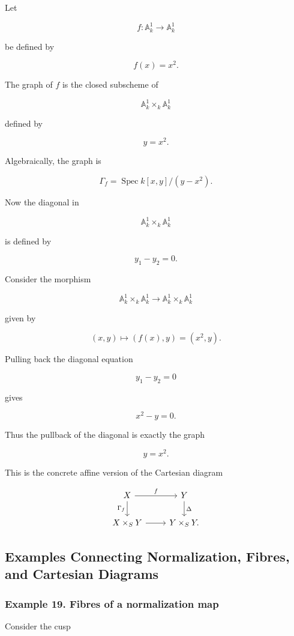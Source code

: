 \documentclass[12pt,a4paper]{article}
\theoremstyle{notespace}
\begin{document}
Let

\[
f:\mathbb{A}^1_k\to \mathbb{A}^1_k
\]

be defined by

\[
f(x)=x^2.
\]

The graph of \(f\) is the closed subscheme of

\[
\mathbb{A}^1_k\times_k \mathbb{A}^1_k
\]

defined by

\[
y=x^2.
\]

Algebraically, the graph is

\[
\Gamma_f=\operatorname{Spec}k[x,y]/(y-x^2).
\]

Now the diagonal in

\[
\mathbb{A}^1_k\times_k \mathbb{A}^1_k
\]

is defined by

\[
y_1-y_2=0.
\]

Consider the morphism

\[
\mathbb{A}^1_k\times_k \mathbb{A}^1_k
\to
\mathbb{A}^1_k\times_k \mathbb{A}^1_k
\]

given by

\[
(x,y)\mapsto (f(x),y)=(x^2,y).
\]

Pulling back the diagonal equation

\[
y_1-y_2=0
\]

gives

\[
x^2-y=0.
\]

Thus the pullback of the diagonal is exactly the graph

\[
y=x^2.
\]

This is the concrete affine version of the Cartesian diagram

\[
\begin{tikzcd}
	X \arrow[r,"f"] \arrow[d,"\Gamma_f"']
	&
	Y \arrow[d,"\Delta"]
	\\
	X\times_S Y \arrow[r]
	&
	Y\times_S Y.
\end{tikzcd}
\]

\subsection{Examples Connecting Normalization, Fibres, and Cartesian Diagrams}

\subsubsection{Example 19. Fibres of a normalization map}

Consider the cusp
\end{document}
